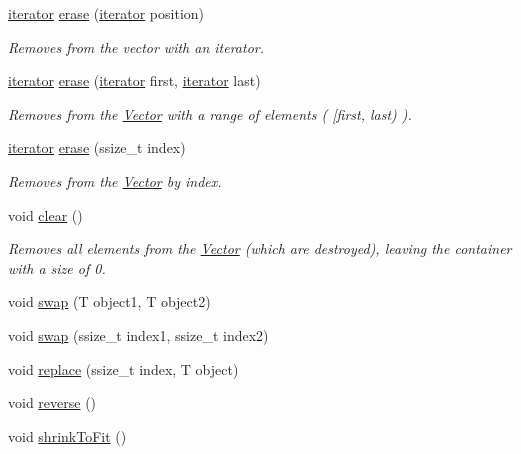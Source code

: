 \begin{DoxyCompactItemize}
\item 
\hyperlink{classVector_a45531016f99e90887e0f890f2da943e4}{iterator} \hyperlink{classVector_a65771dd1c5da427eabb9818ba9558113}{erase} (\hyperlink{classVector_a45531016f99e90887e0f890f2da943e4}{iterator} position)
\begin{DoxyCompactList}\small\item\em Removes from the vector with an iterator. \end{DoxyCompactList}\item 
\hyperlink{classVector_a45531016f99e90887e0f890f2da943e4}{iterator} \hyperlink{classVector_afd90059f9dff48f4417b51f6eae8e152}{erase} (\hyperlink{classVector_a45531016f99e90887e0f890f2da943e4}{iterator} first, \hyperlink{classVector_a45531016f99e90887e0f890f2da943e4}{iterator} last)
\begin{DoxyCompactList}\small\item\em Removes from the \hyperlink{classVector}{Vector} with a range of elements ( \mbox{[}first, last) ). \end{DoxyCompactList}\item 
\hyperlink{classVector_a45531016f99e90887e0f890f2da943e4}{iterator} \hyperlink{classVector_ab1947437ba829a39c6fd20ada89ec892}{erase} (ssize\+\_\+t index)
\begin{DoxyCompactList}\small\item\em Removes from the \hyperlink{classVector}{Vector} by index. \end{DoxyCompactList}\item 
void \hyperlink{classVector_a32ad98b135472b0ebc5d6cb3ae5d0085}{clear} ()
\begin{DoxyCompactList}\small\item\em Removes all elements from the \hyperlink{classVector}{Vector} (which are destroyed), leaving the container with a size of 0. \end{DoxyCompactList}\item 
void \hyperlink{classVector_a7a46eb16510bb61368d2635d677a9c93}{swap} (T object1, T object2)
\item 
void \hyperlink{classVector_a42d2c65fb958b1cd850881c49c844e18}{swap} (ssize\+\_\+t index1, ssize\+\_\+t index2)
\item 
void \hyperlink{classVector_a3c3ccb39cb5e6f3e56b37f913ada4365}{replace} (ssize\+\_\+t index, T object)
\item 
void \hyperlink{classVector_ab5ab9d731026fcf0001c7252a55923ac}{reverse} ()
\item 
void \hyperlink{classVector_a170ee83bfb8dbfbf9587600012e2bb04}{shrink\+To\+Fit} ()

\end{DoxyCompactItemize}
